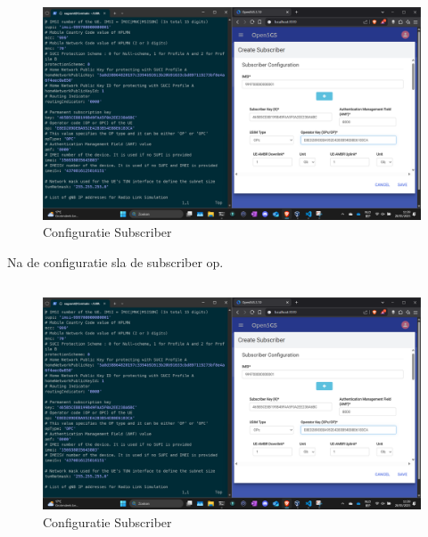 \begin{figure}[h]
    \includegraphics[width=\linewidth]{../graphics/POC-subConfig.png}
    \caption{Configuratie Subscriber}
    \label{fig:SubConfig}
\end{figure}

Na de configuratie sla de subscriber op. 

\subsection{}%
\label{sec:run}%

\begin{figure}[h]
    \includegraphics[width=\linewidth]{../graphics/POC-subConfig.png}
    \caption{Configuratie Subscriber}
    \label{fig:SubConfig}
\end{figure}